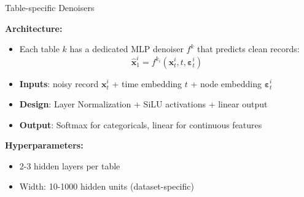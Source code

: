 \begin{frame}[fragile]{Table-specific Denoisers}

\textbf{Architecture:}
\begin{itemize}
  \item Each table $k$ has a dedicated MLP denoiser $f^k$ that predicts clean records:
  \begin{equation*}
  \hat{\mathbf{x}}^i_1 = f^{k_i}(\mathbf{x}^i_t, t, \boldsymbol{\varepsilon}^i_t)
  \end{equation*}
  \item \textbf{Inputs}: noisy record $\mathbf{x}^i_t$ + time embedding $t$ + node embedding $\boldsymbol{\varepsilon}^i_t$
  \item \textbf{Design}: Layer Normalization + SiLU activations + linear output
  \item \textbf{Output}: Softmax for categoricals, linear for continuous features
\end{itemize}

\textbf{Hyperparameters:}
\begin{itemize}
  \item 2-3 hidden layers per table
  \item Width: 10-1000 hidden units (dataset-specific)
\end{itemize}

\end{frame}

